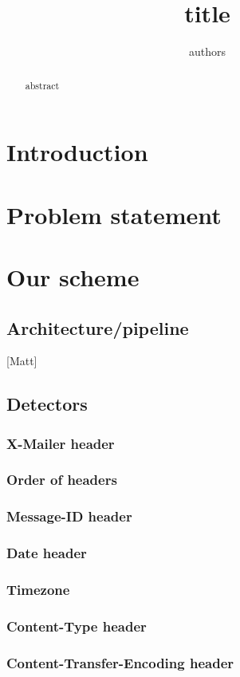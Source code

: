 \documentclass[letterpaper]{article}
\begin{document}
\title{title}
\author{authors}
\maketitle

\begin{abstract}
abstract
\end{abstract}

\section{Introduction}
\section{Problem statement}
\section{Our scheme}
\subsection{Architecture/pipeline}
[Matt]
\subsection{Detectors}
\subsubsection{X-Mailer header}
\subsubsection{Order of headers}
\subsubsection{Message-ID header}
\subsubsection{Date header}
\subsubsection{Timezone}
\subsubsection{Content-Type header}
\subsubsection{Content-Transfer-Encoding header}
\end{document}
